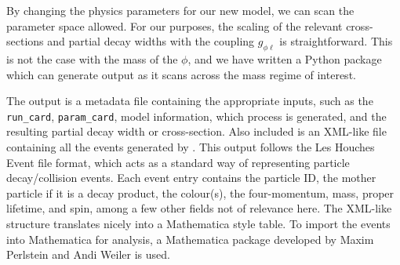 By changing the physics parameters for our new model, we can scan the parameter space allowed.
For our purposes, the scaling of the relevant cross-sections and partial decay widths with the coupling $g_{\phi\ell}$ is straightforward.
This is not the case with the mass of the $\phi$, and we have written a Python package which can generate \madgraph output as it scans across the mass regime of interest.

The output is a metadata file containing the appropriate inputs, such as the \texttt{run\_card}, \texttt{param\_card}, model information, which process is generated, and the resulting partial decay width or cross-section.
Also included is an XML-like file containing all the events generated by \madgraph.
This output follows the Les Houches Event file format\cite{Alwall:2006yp}, which acts as a standard way of representing particle decay/collision events.
Each event entry contains the particle ID, the mother particle if it is a decay product, the colour(s), the four-momentum, mass, proper lifetime, and spin, among a few other fields not of relevance here.
The XML-like structure translates nicely into a Mathematica style table.
To import the events into Mathematica for analysis, a Mathematica package developed by Maxim Perlstein and Andi Weiler is used.
